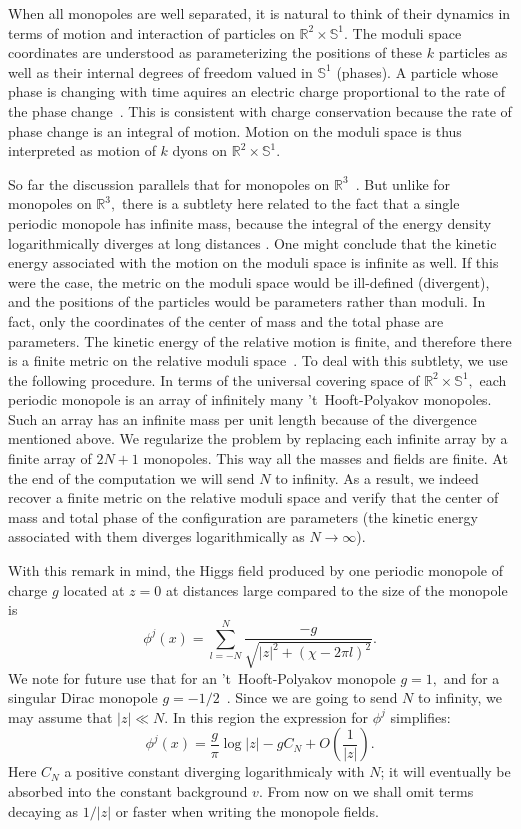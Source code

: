 \documentclass[a4paper,12pt, amsfonts, amssymb]{article}
\newcommand{\RR}{{\mathbb R}}
\renewcommand{\SS}{{\mathbb S}}
\newcommand{\ra}{\rightarrow}
\begin{document}
When all monopoles are well separated, it is natural to think of their
dynamics in terms of motion and interaction of particles on $\RR^2\times\SS^1$. The moduli space coordinates are understood as parameterizing the positions of these $k$ particles as well as their internal degrees of freedom valued in $\SS^1$
(phases). A particle whose phase is changing with time
aquires an electric charge proportional to the rate of the phase
change~\cite{Mtn}. This is consistent with charge conservation because the
rate of phase change is an integral of motion.
Motion on the moduli space is thus interpreted as motion of $k$ dyons on $\RR^2\times\SS^1$.

So far the discussion parallels that for monopoles on $\RR^3$~\cite{Mtn}.
But unlike for monopoles on $\RR^3,$ there is a subtlety here related to the
fact that a single periodic monopole has infinite mass, because the
integral of the energy density logarithmically diverges at long distances
\cite{usone, ustwo}. One might conclude that the kinetic energy
associated with the motion on the moduli space is infinite as well.
If this were the case, the metric on the moduli space would be ill-defined
(divergent), and the positions of the particles would be parameters rather
than moduli. In fact, only the coordinates of the center of mass and the total
phase are parameters. The kinetic energy of the relative motion is finite,
and therefore there is a finite metric on the relative moduli
space~\cite{ustwo}.
To deal with this subtlety, we use the following procedure. In terms of the universal covering space of $\RR^2\times\SS^1,$ each periodic monopole is an array of infinitely many 't~Hooft-Polyakov monopoles. Such an array has an
infinite mass per unit length because of the divergence mentioned above. We regularize the problem by replacing
each infinite array by a finite array of $2N+1$ monopoles. This way all the masses and fields are finite. At the end of the computation we will send $N$ to infinity. As a result, we indeed recover a finite metric on the relative moduli space and verify that the center of mass and total phase of the configuration are parameters (the kinetic energy associated with them
diverges logarithmically as $N\ra\infty$).

With this remark in mind, the Higgs field produced by one periodic monopole of charge $g$ located at $z=0$ at distances large compared to the size of the monopole is
\begin{equation}
\phi^j(x)=\sum_{l=-N}^N\frac{-g}{\sqrt{|z|^2+(\chi-2\pi l)^2}}.
\end{equation}
We note for future use that for an 't~Hooft-Polyakov monopole $g=1,$ and for a singular Dirac monopole $g=-1/2$~\cite{ustwo}.
Since we are going to send $N$ to infinity, we may assume that $|z|\ll N.$
In this region the expression for $\phi^j$ simplifies:
\begin{equation}
\phi^j(x)=\frac{g}{\pi}\log|z|-gC_N+O\left(\frac{1}{|z|}\right).
\end{equation}
Here $C_N$ a positive constant diverging logarithmicaly with $N$; it will eventually be absorbed into the constant background $v$. From now on we shall omit terms decaying as $1/|z|$ or faster when writing the monopole fields.
\end{document}
